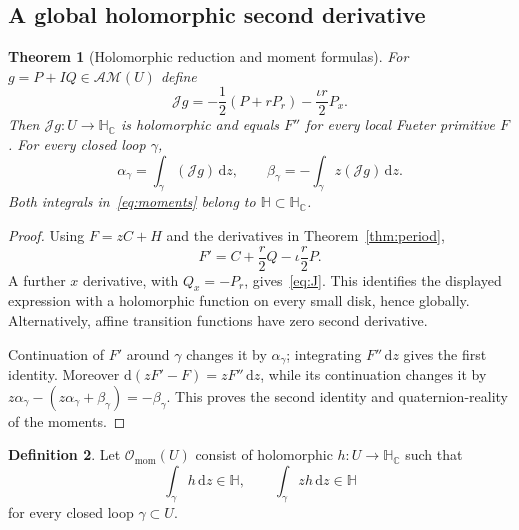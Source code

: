 \documentclass[11pt,a4paper]{article}
\numberwithin{equation}{section}
\newtheorem{theorem}{Theorem}[section]
\theoremstyle{definition}
\newtheorem{definition}[theorem]{Definition}
\theoremstyle{remark}
\newcommand{\C}{\mathbb C}
\newcommand{\HH}{\mathbb H}
\newcommand{\HC}{\mathbb H_{\C}}
\newcommand{\AM}{\mathcal{AM}}
\newcommand{\Hol}{\mathcal O}
\newcommand{\J}{\mathcal J}
\newcommand{\dz}{\,\mathrm dz}
\begin{document}
\subsection{A global holomorphic second derivative}
\begin{theorem}[Holomorphic reduction and moment formulas]\label{thm:J}
For $g=P+IQ\in\AM(U)$ define
\begin{equation}
 \J g=-\frac12(P+rP_r)-\frac{\iota r}{2}P_x.
 \label{eq:J}
\end{equation}
Then $\J g:U\to\HC$ is holomorphic and equals $F''$ for every local
Fueter primitive $F$. For every closed loop $\gamma$,
\begin{equation}
 \alpha_\gamma=\int_\gamma(\J g)\dz,
 \qquad
 \beta_\gamma=-\int_\gamma z(\J g)\dz.
 \label{eq:moments}
\end{equation}
Both integrals in~\eqref{eq:moments} belong to $\HH\subset\HC$.
\end{theorem}
\begin{proof}
Using $F=zC+H$ and the derivatives in Theorem~\ref{thm:period},
\[
 F'=C+\frac r2Q-\iota\frac r2P.
\]
A further $x$ derivative, with $Q_x=-P_r$, gives~\eqref{eq:J}.
This identifies the displayed expression with a holomorphic function on
every small disk, hence globally. Alternatively, affine transition
functions have zero second derivative.

Continuation of $F'$ around $\gamma$ changes it by $\alpha_\gamma$;
integrating $F''\dz$ gives the first identity. Moreover
$\mathrm d(zF'-F)=zF''\dz$, while its continuation changes it by
$z\alpha_\gamma-(z\alpha_\gamma+\beta_\gamma)=-\beta_\gamma$.
This proves the second identity and quaternion-reality of the moments.
\end{proof}

\begin{definition}
Let $\Hol_{\mathrm{mom}}(U)$ consist of holomorphic $h:U\to\HC$ such that
\[
 \int_\gamma h\dz\in\HH,\qquad
 \int_\gamma zh\dz\in\HH
\]
for every closed loop $\gamma\subset U$.
\end{definition}
\end{document}
